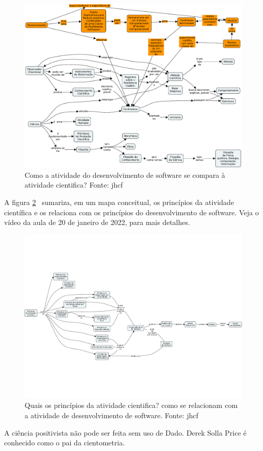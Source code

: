 \begin{figure}
    \centering
    \includegraphics[page=1,angle=90,width=1\textwidth]{1-Introducao/aulas/Desenvolvimento-de-Software-Ciencia-e-Filosofia.pdf}
    \caption{Como a atividade do desenvolvimento de software se compara à atividade cientifica? Fonte: jhcf}
    \label{fig:desenv-sw-ciencia-filosofia}
\end{figure}

A figura \ref{fig:principios:ativ:cientifica}~ sumariza, em um mapa conceitual, os princípios da atividade científica e os relaciona com os princípios do desenvolvimento de software.
Veja o vídeo da aula de 20 de janeiro de 2022, para mais detalhes.

\begin{figure}
    \centering
    \includegraphics[page=1,angle=90,width=1\textwidth]{1-Introducao/aulas/Principios-da-atividade-cientifica.pdf}
    \caption{Quais os princípios da  atividade cientifica? como se relacionam com a atividade de desenvolvimento de software. Fonte: jhcf}
    \label{fig:principios:ativ:cientifica}
\end{figure}

A ciência positivista não pode ser feita sem uso de \gls{Dado}.
\gls{Derek Solla Price} é conhecido como o pai da  cientometria.
